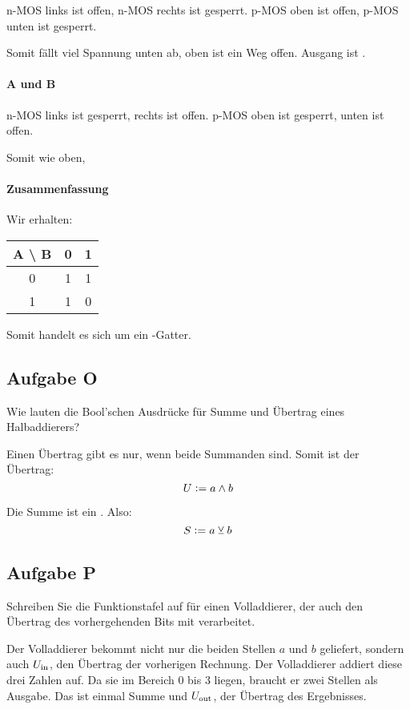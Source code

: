 n-MOS links ist offen, n-MOS rechts ist gesperrt. p-MOS oben ist offen, p-MOS
unten ist gesperrt.

Somit fällt viel Spannung unten ab, oben ist ein Weg offen. Ausgang ist \thigh.

\paragraph{A \tlow{} und B \thigh}

n-MOS links ist gesperrt, rechts ist offen. p-MOS oben ist gesperrt, unten ist
offen.

Somit wie oben, \thigh

\paragraph{Zusammenfassung}

Wir erhalten:

\begin{tabular}{c|cc}
	A \textbackslash{} B & 0 & 1 \\
	\hline
	0 & 1 & 1 \\
	1 & 1 & 0
\end{tabular}

Somit handelt es sich um ein \tnand-Gatter.

\FloatBarrier
\subsection{Aufgabe O}

\begin{problem}
	Wie lauten die Bool'schen Ausdrücke für Summe und Übertrag eines
	Halbaddierers?
\end{problem}

Einen Übertrag gibt es nur, wenn beide Summanden \thigh{} sind. Somit ist der
Übertrag:
\[
	U := a \wedge b
\]

Die Summe ist ein \txor. Also:
\[
	S := a \veebar b
\]

\FloatBarrier
\subsection{Aufgabe P}

\begin{problem}
	Schreiben Sie die Funktionstafel auf für einen Volladdierer, der auch den
	Übertrag des vorhergehenden Bits mit verarbeitet.
\end{problem}

Der Volladdierer bekommt nicht nur die beiden Stellen $a$ und $b$ geliefert,
sondern auch $U_\text{in}$, den Übertrag der vorherigen Rechnung. Der Volladdierer
addiert diese drei Zahlen auf. Da sie im Bereich 0 bis 3 liegen, braucht er
zwei Stellen als Ausgabe. Das ist einmal Summe und $U_\text{out}$, der Übertrag des
Ergebnisses.

